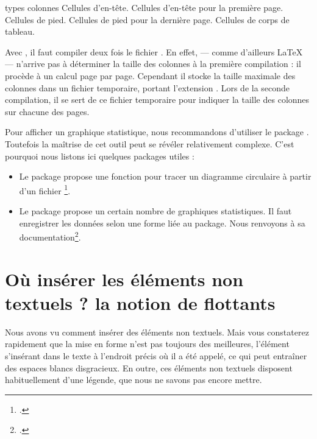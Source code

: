 \begin{latexcode}
\begin{longtable}{types colonnes}
Cellules d'en-tête.
\endhead
Cellules d'en-tête pour la première page.
\endfirsthead
Cellules de pied.
\endfoot
Cellules de pied pour la dernière page.
\endlastfoot
Cellules de corps de tableau.
\end{longtable}
\end{latexcode}

\begin{attention}
Avec , il faut compiler deux fois le fichier . 
En effet, \XeLaTeX{} --- comme d'ailleurs \LaTeX{} --- n'arrive pas à déterminer la taille des colonnes à la première compilation : il procède à un calcul page par page. Cependant il stocke la taille maximale des colonnes dans un fichier temporaire, portant l'extension . Lors de la seconde compilation, il se sert de ce fichier temporaire pour indiquer la taille des colonnes sur chacune des pages.
\end{attention}


\begin{plusloins}
Pour afficher un graphique statistique, nous recommandons d'utiliser le package . Toutefois la maîtrise de cet outil peut se révéler relativement complexe. C'est pourquoi nous listons ici quelques packages utiles : 
\begin{itemize}
\item Le package  propose une fonction pour tracer un diagramme circulaire à partir d'un fichier \footcite[Sa documentation se trouve dans celle du package  :][]{csvtools_pie}. 
\item Le package  propose un certain nombre de graphiques statistiques. Il faut enregistrer les données selon une forme liée au package. Nous renvoyons à sa documentation\footcite{datatool}.
\end{itemize}
\end{plusloins}


\section[La notion de flottants]{Où insérer les éléments non textuels ?  la notion de flottants}
\label{legende}
Nous avons vu comment insérer des éléments non textuels. Mais vous constaterez rapidement que la mise en forme n'est pas toujours des meilleures, l'élément s'insérant dans le texte à l'endroit précis où il a été appelé, ce qui peut entraîner des espaces blancs disgracieux.
En outre, ces éléments non textuels disposent habituellement d'une légende, que nous ne savons pas encore mettre.

